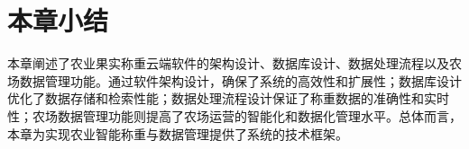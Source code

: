 

\section{本章小结}

本章阐述了农业果实称重云端软件的架构设计、数据库设计、数据处理流程以及农场数据管理功能。通过软件架构设计，确保了系统的高效性和扩展性；数据库设计优化了数据存储和检索性能；数据处理流程设计保证了称重数据的准确性和实时性；农场数据管理功能则提高了农场运营的智能化和数据化管理水平。总体而言，本章为实现农业智能称重与数据管理提供了系统的技术框架。
